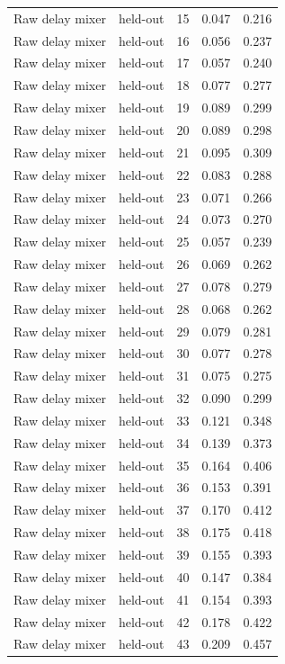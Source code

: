 \begin{tabular}{llrrr}
Raw delay mixer & held-out & 15 & 0.047 & 0.216 \\
Raw delay mixer & held-out & 16 & 0.056 & 0.237 \\
Raw delay mixer & held-out & 17 & 0.057 & 0.240 \\
Raw delay mixer & held-out & 18 & 0.077 & 0.277 \\
Raw delay mixer & held-out & 19 & 0.089 & 0.299 \\
Raw delay mixer & held-out & 20 & 0.089 & 0.298 \\
Raw delay mixer & held-out & 21 & 0.095 & 0.309 \\
Raw delay mixer & held-out & 22 & 0.083 & 0.288 \\
Raw delay mixer & held-out & 23 & 0.071 & 0.266 \\
Raw delay mixer & held-out & 24 & 0.073 & 0.270 \\
Raw delay mixer & held-out & 25 & 0.057 & 0.239 \\
Raw delay mixer & held-out & 26 & 0.069 & 0.262 \\
Raw delay mixer & held-out & 27 & 0.078 & 0.279 \\
Raw delay mixer & held-out & 28 & 0.068 & 0.262 \\
Raw delay mixer & held-out & 29 & 0.079 & 0.281 \\
Raw delay mixer & held-out & 30 & 0.077 & 0.278 \\
Raw delay mixer & held-out & 31 & 0.075 & 0.275 \\
Raw delay mixer & held-out & 32 & 0.090 & 0.299 \\
Raw delay mixer & held-out & 33 & 0.121 & 0.348 \\
Raw delay mixer & held-out & 34 & 0.139 & 0.373 \\
Raw delay mixer & held-out & 35 & 0.164 & 0.406 \\
Raw delay mixer & held-out & 36 & 0.153 & 0.391 \\
Raw delay mixer & held-out & 37 & 0.170 & 0.412 \\
Raw delay mixer & held-out & 38 & 0.175 & 0.418 \\
Raw delay mixer & held-out & 39 & 0.155 & 0.393 \\
Raw delay mixer & held-out & 40 & 0.147 & 0.384 \\
Raw delay mixer & held-out & 41 & 0.154 & 0.393 \\
Raw delay mixer & held-out & 42 & 0.178 & 0.422 \\
Raw delay mixer & held-out & 43 & 0.209 & 0.457 \\

\end{tabular}
